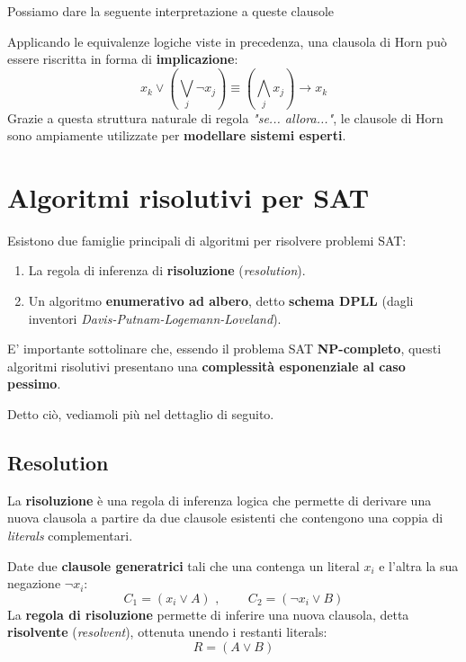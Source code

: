 Possiamo dare la seguente interpretazione a queste clausole

\begin{remark}
    Applicando le equivalenze logiche viste in precedenza, una clausola di Horn può essere 
    riscritta in forma di \textbf{implicazione}:
    \[
        x_k \lor \left(\bigvee_j \neg x_j\right) \equiv \left(\bigwedge_j x_j\right) \to x_k
    \]
    Grazie a questa struttura naturale di regola \textit{"se... allora..."}, le clausole 
    di Horn sono ampiamente utilizzate per \textbf{modellare sistemi esperti}.
\end{remark}

\section{Algoritmi risolutivi per SAT}

Esistono due famiglie principali di algoritmi per risolvere problemi SAT:
\begin{enumerate}
    \item La regola di inferenza di \textbf{risoluzione} (\textit{resolution}).
    \item Un algoritmo \textbf{enumerativo ad albero}, detto \textbf{schema DPLL} 
        (dagli inventori \textit{Davis-Putnam-Logemann-Loveland}).
\end{enumerate}

E' importante sottolinare che, essendo il problema SAT \textbf{NP-completo}, questi 
algoritmi risolutivi presentano una \textbf{complessità esponenziale al caso pessimo}.

Detto ciò, vediamoli più nel dettaglio di seguito.

\subsection{Resolution}

La \textbf{risoluzione} è una regola di inferenza logica che permette di derivare una 
nuova clausola a partire da due clausole esistenti che contengono una coppia di 
\textit{literals} complementari.

\begin{definition}
    Date due \textbf{clausole generatrici} tali che una contenga un literal $x_i$ e l'altra 
    la sua negazione $\neg x_i$:
    \[
        C_1 = (x_i \lor A) \text{ , } \qquad C_2 = (\neg x_i \lor B)
    \]
    La \textbf{regola di risoluzione} permette di inferire una nuova clausola, detta 
    \textbf{risolvente} (\textit{resolvent}), ottenuta unendo i restanti literals:
    \[
        R = (A \lor B)
    \]
\end{definition}

